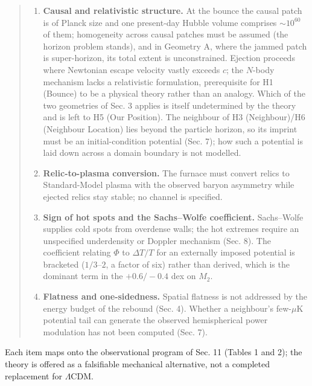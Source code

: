 \documentclass[
]{article}
\begin{document}
\begin{quote}
\begin{enumerate}
  distance--redshift relation (the LTB-plus-tension lightcone) has not
  been computed. The model is also not yet reconciled with BBN
  abundances or the CMB acoustic peaks.
\item
  \textbf{Causal and relativistic structure.} At the bounce the causal
  patch is of Planck size and one present-day Hubble volume comprises
  \(\sim\!10^{60}\) of them; homogeneity across causal patches must be
  assumed (the horizon problem stands), and in Geometry A, where the
  jammed patch is super-horizon, its total extent is unconstrained.
  Ejection proceeds where Newtonian escape velocity vastly exceeds
  \(c\); the \(N\)-body mechanism lacks a relativistic formulation,
  prerequisite for H1 (Bounce) to be a physical theory rather than an
  analogy. Which of the two geometries of Sec. 3 applies is itself
  undetermined by the theory and is left to H5 (Our Position). The
  neighbour of H3 (Neighbour)/H6 (Neighbour Location) lies beyond the
  particle horizon, so its imprint must be an initial-condition
  potential (Sec. 7); how such a potential is laid down across a domain
  boundary is not modelled.
\item
  \textbf{Relic-to-plasma conversion.} The furnace must convert relics
  to Standard-Model plasma with the observed baryon asymmetry while
  ejected relics stay stable; no channel is specified.
\item
  \textbf{Sign of hot spots and the Sachs--Wolfe coefficient.}
  Sachs--Wolfe supplies cold spots from overdense walls; the hot
  extremes require an unspecified underdensity or Doppler mechanism
  (Sec. 8). The coefficient relating \(\Phi\) to \(\Delta T/T\) for an
  externally imposed potential is bracketed (\(1/3\)--\(2\), a factor of
  six) rather than derived, which is the dominant term in the
  \(+0.6/-0.4\) dex on \(M_2\).
\item
  \textbf{Flatness and one-sidedness.} Spatial flatness is not addressed
  by the energy budget of the rebound (Sec. 4). Whether a neighbour's
  few-\(\mu\)K potential tail can generate the observed hemispherical
  power modulation has not been computed (Sec. 7).
\end{enumerate}
\end{quote}

Each item maps onto the observational program of Sec. 11 (Tables 1 and
2); the theory is offered as a falsifiable mechanical alternative, not a
completed replacement for \(\Lambda\)CDM.
\end{document}

